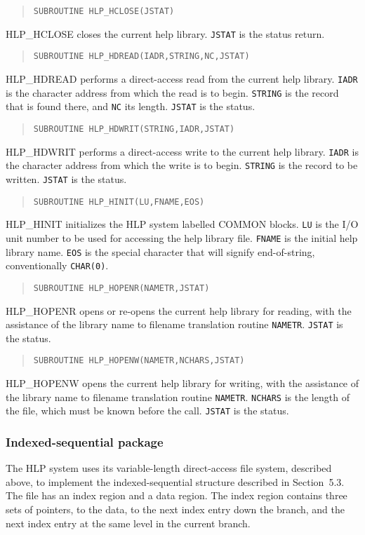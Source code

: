 \begin{verse}
{\tt SUBROUTINE HLP\_HCLOSE(JSTAT)}
\end{verse}
HLP\_HCLOSE closes the current help library.  {\tt JSTAT} is the
status return.

\begin{verse}
{\tt SUBROUTINE HLP\_HDREAD(IADR,STRING,NC,JSTAT)}
\end{verse}
HLP\_HDREAD performs a direct-access read from the current help library.
{\tt IADR} is the character address from which the read is to
begin.  {\tt STRING} is the record that is found there, and
{\tt NC} its length.  {\tt JSTAT} is the status.

\begin{verse}
{\tt SUBROUTINE HLP\_HDWRIT(STRING,IADR,JSTAT)}
\end{verse}
HLP\_HDWRIT performs a direct-access write to the current help library.
{\tt IADR} is the character address from which the write is to begin.
{\tt STRING} is the record to be written.  {\tt JSTAT} is the status.

\begin{verse}
{\tt SUBROUTINE HLP\_HINIT(LU,FNAME,EOS)}
\end{verse}
HLP\_HINIT initializes the HLP system labelled COMMON blocks.
{\tt LU} is the I/O unit number to be used for accessing the
help library file.  {\tt FNAME} is the initial help library name.
{\tt EOS} is the special character that will signify end-of-string,
conventionally {\tt CHAR(0)}.

\begin{verse}
{\tt SUBROUTINE HLP\_HOPENR(NAMETR,JSTAT)}
\end{verse}
HLP\_HOPENR opens or re-opens the current help library for reading,
with the assistance of the library name to filename translation
routine {\tt NAMETR}.
{\tt JSTAT} is the status.

\begin{verse}
{\tt SUBROUTINE HLP\_HOPENW(NAMETR,NCHARS,JSTAT)}
\end{verse}
HLP\_HOPENW opens the current help library for writing,
with the assistance of the library name to filename translation
routine {\tt NAMETR}.
{\tt NCHARS}
is the length of the file, which must be known before the call.
{\tt JSTAT} is the status.

\subsubsection{Indexed-sequential package}
The HLP system uses its variable-length direct-access file
system, described above,
to implement the indexed-sequential structure described
in Section~5.3.  The file has an index region and a
data region.  The index region contains three sets of pointers,
to the data, to the next index entry down the branch, and the
next index entry at the same level in the current branch.

